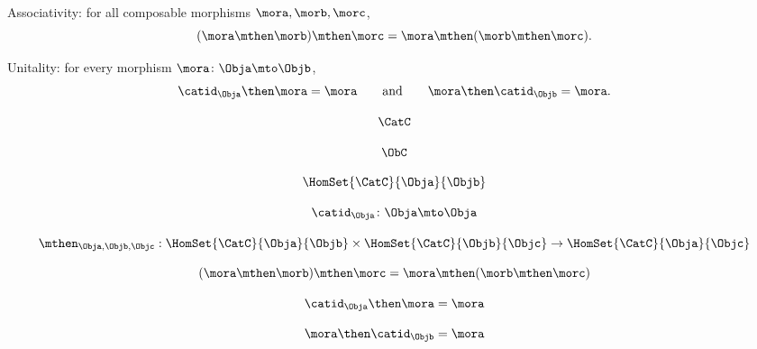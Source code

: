 {\begin{forslides}
\begin{ctdefinition}
\begin{body}
\begin{compactenum}
				\end{compactenum}
				\condit
				\begin{compactenum}
					\item Associativity: for all composable morphisms $\mora, \morb, \morc$,
					\begin{equation}
						(\mora\mthen \morb)
						\mthen \morc= \mora \mthen (\morb \mthen \morc).
					\end{equation}
					\item Unitality: for every morphism $\mora \colon \Obja \mto \Objb$,
					$$ \catid_{\Obja} \then \mora = \mora \quad \quad \text{and} \quad \quad \mora \then \catid_{\Objb} = \mora. $$
				\end{compactenum}
			\end{body}
		\end{ctdefinition}

		\begin{equation}
			\label{eq:15}
			\CatC
		\end{equation}

		\begin{equation}
			\label{eq:16}
			\ObC
		\end{equation}

		\begin{equation}
			\label{eq:17}
			\HomSet{\CatC}{\Obja}{\Objb}
		\end{equation}

		\begin{equation}
			\label{eq:18}
			\catid_{\Obja}\colon \Obja \mto \Obja
		\end{equation}

		\begin{equation}
			\label{eq:19}
			\mthen_{\Obja,\Objb,\Objc}: \HomSet{\CatC}{\Obja}{\Objb} \times \HomSet{\CatC}{\Objb}{\Objc}\to \HomSet{\CatC}{\Obja}{\Objc}
		\end{equation}

		\begin{equation}
			\label{eq:20}
			(\mora\mthen \morb)
			\mthen \morc= \mora \mthen (\morb \mthen \morc)
		\end{equation}

		\begin{equation}
			\label{eq:21}
			\catid_{\Obja} \then \mora = \mora
		\end{equation}

		\begin{equation}
			\label{eq:22}
			\mora \then \catid_{\Objb} = \mora
		\end{equation}


\end{forslides}}
